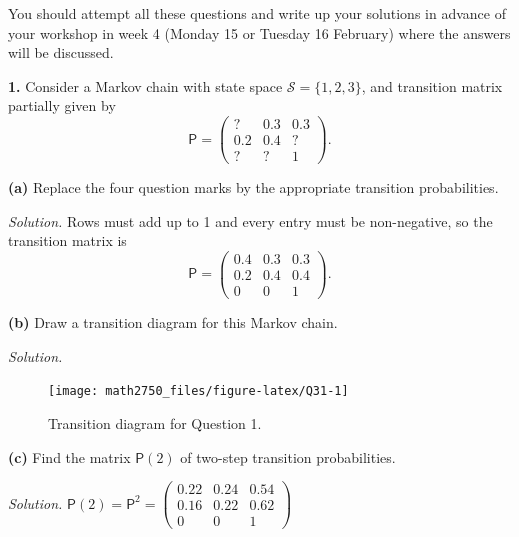 \documentclass[
  a4paper,
]{article}
\newif\ifcomm\commtrue
\theoremstyle{definition}
\theoremstyle{definition}
\theoremstyle{definition}
\theoremstyle{remark}
\begin{document}
\commtrue

You should attempt all these questions and write up your solutions in advance of your workshop in week 4 (Monday 15 or Tuesday 16 February) where the answers will be discussed.

\textbf{1.} Consider a Markov chain with state space \(\mathcal S = \{1,2,3\}\), and transition matrix partially given by
\[ \mathsf P = \begin{pmatrix} ? & 0.3 & 0.3 \\ 0.2 & 0.4 & ? \\ ? & ? & 1 \end{pmatrix} . \]

\textbf{(a)} Replace the four question marks by the appropriate transition probabilities.

\begin{myanswers}
\emph{Solution.} Rows must add up to 1 and every entry must be non-negative, so the transition matrix is
\[ \mathsf P = \begin{pmatrix} 0.4 & 0.3 & 0.3 \\ 0.2 & 0.4 & 0.4 \\ 0 & 0 & 1 \end{pmatrix} . \]

\end{myanswers}

\textbf{(b)} Draw a transition diagram for this Markov chain.

\begin{myanswers}

\emph{Solution.}

\begin{figure}

{\centering \texttt{[image: math2750\_files/figure-latex/Q31-1]} 

}

\caption{Transition diagram for Question 1.}\label{fig:Q31}
\end{figure}

\end{myanswers}

\textbf{(c)} Find the matrix \(\mathsf P(2)\) of two-step transition probabilities.

\begin{myanswers}
\emph{Solution.} \({\displaystyle \mathsf P(2) = \mathsf P^2 = \begin{pmatrix} 0.22 & 0.24 & 0.54 \\ 0.16 & 0.22 & 0.62 \\ 0 & 0 & 1 \end{pmatrix}}\)

\end{myanswers}
\end{document}
